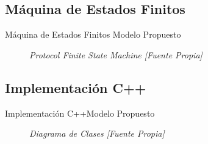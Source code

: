 \subsection{Máquina de Estados Finitos}
\begin{frame}{Máquina de Estados Finitos}	{Modelo Propuesto}
    \begin{figure}				
		\caption{\small \sl Protocol Finite State Machine [Fuente Propia]}
		\label{figure:ProtocolFSM}
    \end{figure}
\end{frame}
\subsection{Implementación C++}
\begin{frame}{Implementación C++}{Modelo Propuesto}
    \begin{figure}				
		\caption{\small \sl Diagrama de Clases [Fuente Propia]}
		\label{figure:DiagramaClases}
    \end{figure}
\end{frame}
